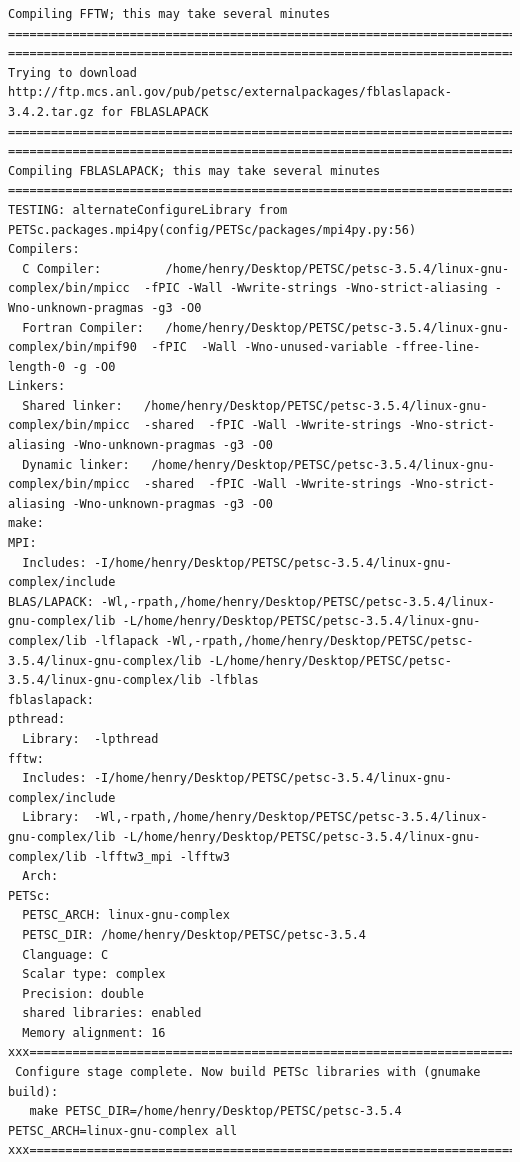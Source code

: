\documentclass{article}
\begin{document}
\begin{enumerate}
\begin{verbatim}
Compiling FFTW; this may take several minutes
===============================================================================
===============================================================================
Trying to download http://ftp.mcs.anl.gov/pub/petsc/externalpackages/fblaslapack-3.4.2.tar.gz for FBLASLAPACK
===============================================================================
===============================================================================
Compiling FBLASLAPACK; this may take several minutes 
===============================================================================
TESTING: alternateConfigureLibrary from PETSc.packages.mpi4py(config/PETSc/packages/mpi4py.py:56)
Compilers:
  C Compiler:         /home/henry/Desktop/PETSC/petsc-3.5.4/linux-gnu-complex/bin/mpicc  -fPIC -Wall -Wwrite-strings -Wno-strict-aliasing -Wno-unknown-pragmas -g3 -O0 
  Fortran Compiler:   /home/henry/Desktop/PETSC/petsc-3.5.4/linux-gnu-complex/bin/mpif90  -fPIC  -Wall -Wno-unused-variable -ffree-line-length-0 -g -O0 
Linkers:
  Shared linker:   /home/henry/Desktop/PETSC/petsc-3.5.4/linux-gnu-complex/bin/mpicc  -shared  -fPIC -Wall -Wwrite-strings -Wno-strict-aliasing -Wno-unknown-pragmas -g3 -O0
  Dynamic linker:   /home/henry/Desktop/PETSC/petsc-3.5.4/linux-gnu-complex/bin/mpicc  -shared  -fPIC -Wall -Wwrite-strings -Wno-strict-aliasing -Wno-unknown-pragmas -g3 -O0
make:
MPI:
  Includes: -I/home/henry/Desktop/PETSC/petsc-3.5.4/linux-gnu-complex/include
BLAS/LAPACK: -Wl,-rpath,/home/henry/Desktop/PETSC/petsc-3.5.4/linux-gnu-complex/lib -L/home/henry/Desktop/PETSC/petsc-3.5.4/linux-gnu-complex/lib -lflapack -Wl,-rpath,/home/henry/Desktop/PETSC/petsc-3.5.4/linux-gnu-complex/lib -L/home/henry/Desktop/PETSC/petsc-3.5.4/linux-gnu-complex/lib -lfblas
fblaslapack:
pthread:
  Library:  -lpthread
fftw:
  Includes: -I/home/henry/Desktop/PETSC/petsc-3.5.4/linux-gnu-complex/include
  Library:  -Wl,-rpath,/home/henry/Desktop/PETSC/petsc-3.5.4/linux-gnu-complex/lib -L/home/henry/Desktop/PETSC/petsc-3.5.4/linux-gnu-complex/lib -lfftw3_mpi -lfftw3
  Arch:     
PETSc:
  PETSC_ARCH: linux-gnu-complex
  PETSC_DIR: /home/henry/Desktop/PETSC/petsc-3.5.4
  Clanguage: C
  Scalar type: complex
  Precision: double
  shared libraries: enabled
  Memory alignment: 16
xxx=========================================================================xxx
 Configure stage complete. Now build PETSc libraries with (gnumake build):
   make PETSC_DIR=/home/henry/Desktop/PETSC/petsc-3.5.4 PETSC_ARCH=linux-gnu-complex all
xxx=========================================================================xxx
\end{verbatim}
\normalsize


\end{enumerate}
\end{document}
